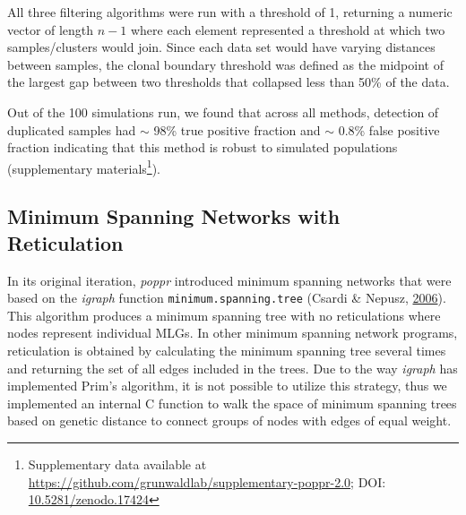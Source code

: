 \documentclass[double,11pt]{beavtex}
\begin{document}
  All three filtering algorithms were run with a threshold of 1, returning
  a numeric vector of length \(n - 1\) where each element represented a
  threshold at which two samples/clusters would join. Since each data set
  would have varying distances between samples, the clonal boundary
  threshold was defined as the midpoint of the largest gap between two
  thresholds that collapsed less than 50\% of the data.
  
  Out of the 100 simulations run, we found that across all methods,
  detection of duplicated samples had \(\sim\) 98\% true positive fraction
  and \(\sim\) 0.8\% false positive fraction indicating that this method
  is robust to simulated populations (supplementary materials\footnote{Supplementary
    data available at
    \url{https://github.com/grunwaldlab/supplementary-poppr-2.0}; DOI:
    \href{http://dx.doi.org/10.5281/zenodo.17424}{10.5281/zenodo.17424}}).
  
  \subsection{Minimum Spanning Networks with
  Reticulation}\label{minimum-spanning-networks-with-reticulation}
  
  In its original iteration, \emph{poppr} introduced minimum spanning
  networks that were based on the \emph{igraph} function
  \texttt{minimum.spanning.tree} (Csardi \& Nepusz,
  \protect\hyperlink{ref-csardi2006igraph}{2006}). This algorithm produces
  a minimum spanning tree with no reticulations where nodes represent
  individual MLGs. In other minimum spanning network programs,
  reticulation is obtained by calculating the minimum spanning tree
  several times and returning the set of all edges included in the trees.
  Due to the way \emph{igraph} has implemented Prim's algorithm, it is not
  possible to utilize this strategy, thus we implemented an internal C
  function to walk the space of minimum spanning trees based on genetic
  distance to connect groups of nodes with edges of equal weight.
  
\end{document}
